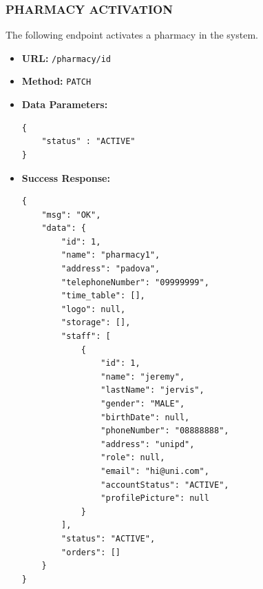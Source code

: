 \subsubsection*{PHARMACY ACTIVATION}
The following endpoint activates a pharmacy in the system.
\begin{itemize}
    \item \textbf{URL:}
    \newline \hspace*{1cm} \texttt{/pharmacy/id}  
    \item \textbf{Method:}
    \newline \hspace*{1cm}\texttt{PATCH}
    \item \textbf{Data Parameters:}
\begin{lstlisting}[breaklines]
{
    "status" : "ACTIVE"
}

\end{lstlisting}
    \item \textbf{Success Response:}
\begin{lstlisting}[breaklines]
{
    "msg": "OK",
    "data": {
        "id": 1,
        "name": "pharmacy1",
        "address": "padova",
        "telephoneNumber": "09999999",
        "time_table": [],
        "logo": null,
        "storage": [],
        "staff": [
            {
                "id": 1,
                "name": "jeremy",
                "lastName": "jervis",
                "gender": "MALE",
                "birthDate": null,
                "phoneNumber": "08888888",
                "address": "unipd",
                "role": null,
                "email": "hi@uni.com",
                "accountStatus": "ACTIVE",
                "profilePicture": null
            }
        ],
        "status": "ACTIVE",
        "orders": []
    }
}

\end{lstlisting}
\end{itemize}
